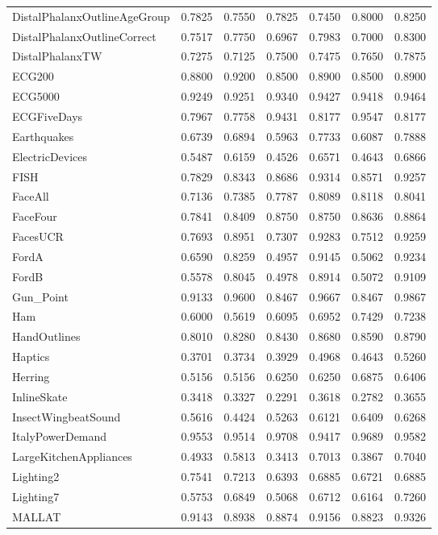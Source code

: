 \begin{longtable}[c]{p{5cm}*{6}{c}}
DistalPhalanxOutlineAgeGroup &0.7825 &0.7550 &0.7825 &0.7450 &0.8000 &0.8250 \\
DistalPhalanxOutlineCorrect &0.7517 &0.7750 &0.6967 &0.7983 &0.7000 &0.8300 \\
DistalPhalanxTW &0.7275 &0.7125 &0.7500 &0.7475 &0.7650 &0.7875 \\
ECG200 &0.8800 &0.9200 &0.8500 &0.8900 &0.8500 &0.8900 \\
ECG5000 &0.9249 &0.9251 &0.9340 &0.9427 &0.9418 &0.9464 \\
ECGFiveDays &0.7967 &0.7758 &0.9431 &0.8177 &0.9547 &0.8177 \\
Earthquakes &0.6739 &0.6894 &0.5963 &0.7733 &0.6087 &0.7888 \\
ElectricDevices &0.5487 &0.6159 &0.4526 &0.6571 &0.4643 &0.6866 \\
FISH &0.7829 &0.8343 &0.8686 &0.9314 &0.8571 &0.9257 \\
FaceAll &0.7136 &0.7385 &0.7787 &0.8089 &0.8118 &0.8041 \\
FaceFour &0.7841 &0.8409 &0.8750 &0.8750 &0.8636 &0.8864 \\
FacesUCR &0.7693 &0.8951 &0.7307 &0.9283 &0.7512 &0.9259 \\
FordA &0.6590 &0.8259 &0.4957 &0.9145 &0.5062 &0.9234 \\
FordB &0.5578 &0.8045 &0.4978 &0.8914 &0.5072 &0.9109 \\
Gun\_Point &0.9133 &0.9600 &0.8467 &0.9667 &0.8467 &0.9867 \\
Ham &0.6000 &0.5619 &0.6095 &0.6952 &0.7429 &0.7238 \\
HandOutlines &0.8010 &0.8280 &0.8430 &0.8680 &0.8590 &0.8790 \\
Haptics &0.3701 &0.3734 &0.3929 &0.4968 &0.4643 &0.5260 \\
Herring &0.5156 &0.5156 &0.6250 &0.6250 &0.6875 &0.6406 \\
InlineSkate &0.3418 &0.3327 &0.2291 &0.3618 &0.2782 &0.3655 \\
InsectWingbeatSound &0.5616 &0.4424 &0.5263 &0.6121 &0.6409 &0.6268 \\
ItalyPowerDemand &0.9553 &0.9514 &0.9708 &0.9417 &0.9689 &0.9582 \\
LargeKitchenAppliances &0.4933 &0.5813 &0.3413 &0.7013 &0.3867 &0.7040 \\
Lighting2 &0.7541 &0.7213 &0.6393 &0.6885 &0.6721 &0.6885 \\
Lighting7 &0.5753 &0.6849 &0.5068 &0.6712 &0.6164 &0.7260 \\
MALLAT &0.9143 &0.8938 &0.8874 &0.9156 &0.8823 &0.9326 \\

\end{longtable}
